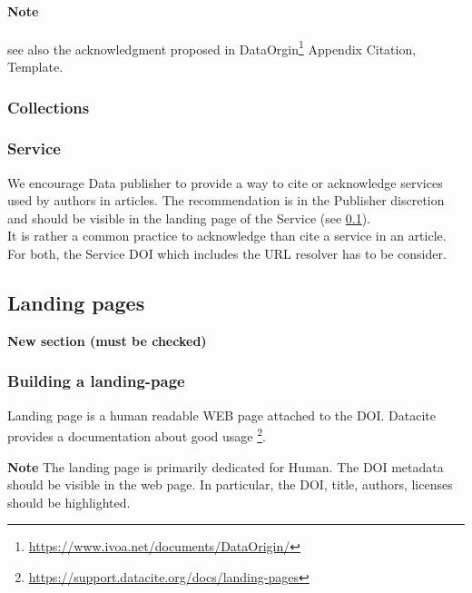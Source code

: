 \documentclass[11pt,a4paper]{ivoa}
\newcommand{\important}[1]{
	\begin{bigdescription}
		\item \color{ivoacolor}\textbf{Note} #1
	\end{bigdescription}
}
\begin{document}
\paragraph{Note} see also the acknowledgment proposed in DataOrgin\footnote{\url{https://www.ivoa.net/documents/DataOrigin/}} Appendix Citation, Template.

\subsubsection{Collections}

\subsubsection{Service}
We encourage Data publisher to provide a way to cite or acknowledge services used by authors in articles. The recommendation is in the Publisher discretion and should be visible in the landing page of the Service (see \ref{sec:landingpage}).\\

It is rather a common practice to acknowledge than cite a service in an article. For both, the Service DOI which includes the URL resolver has to be consider.

\subsection{Landing pages}
\label{sec:landingpage}
\textbf{\color{red}New section (must be checked)}

\subsubsection{Building a landing-page}
Landing page is a human readable WEB page attached to the DOI. Datacite provides a documentation about good usage \footnote{\url{https://support.datacite.org/docs/landing-pages}}.

\important{
	The landing page is primarily dedicated for Human. 
	The DOI metadata should be visible in the web page. In particular, 
	the DOI, title, authors, licenses should be highlighted.
}
\end{document}
